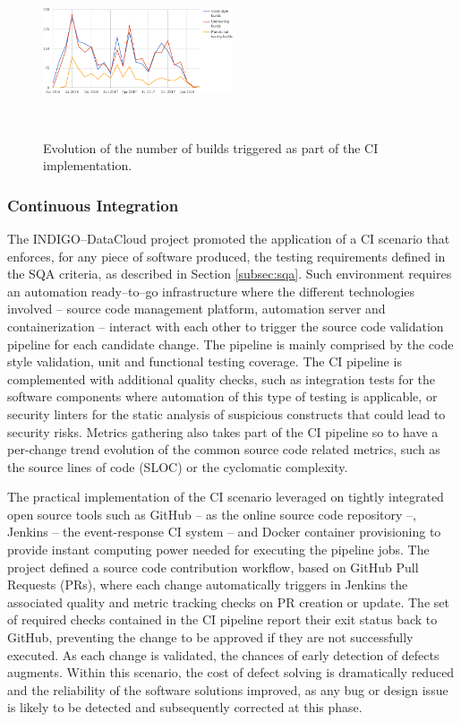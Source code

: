 \documentclass[journal]{IEEEtran}
\begin{document}
\begin{figure}[ht]
\centering
\includegraphics[width=0.5\textwidth, height=50mm]{images/jenkins_CI_builds.png}
\caption{Evolution of the number of builds triggered as part of the CI implementation.}
\label{fig:fig_jenkins_CI_builds}
\end{figure}

\subsubsection{Continuous Integration}
\label{subsec:ci}
The INDIGO--DataCloud project promoted the application of a CI scenario that enforces,
for any piece of software produced, the testing requirements defined in the SQA criteria,
as described in Section \ref{subsec:sqa}. Such environment requires an automation
ready--to--go infrastructure where the different technologies involved -- source code
management platform, automation server and containerization -- interact with each
other to trigger the source code validation pipeline for each candidate change. The
pipeline is mainly comprised by the code style validation, unit and functional testing
coverage. The CI pipeline is complemented with additional quality checks, such as 
integration tests for the software components where automation of this type of testing
is applicable, or security linters for the static analysis of suspicious
constructs that could lead to security risks. Metrics gathering also takes part of
the CI pipeline so to have a per-change trend evolution of the common source code 
related metrics, such as the source lines of code (SLOC) or the cyclomatic complexity. 

The practical implementation of the CI scenario leveraged on tightly integrated open
source tools such as GitHub \cite{github} -- as the online source code repository --,
Jenkins \cite{jenkins} -- the event-response CI system -- and Docker container
provisioning to provide instant computing power needed for executing the pipeline jobs. 
The project defined a source code contribution workflow, based on GitHub Pull Requests 
(PRs), where each change automatically triggers in Jenkins the associated quality and
metric tracking checks on PR creation or update. The set of required checks contained
in the CI pipeline report their exit status back to GitHub, preventing the change to be
approved if they are not successfully executed. As each change is validated, the chances
of early detection of defects augments. Within this scenario, the cost of defect solving
is dramatically reduced and the reliability of the software solutions improved, as any
bug or design issue is likely to be detected and subsequently corrected at this phase.
\end{document}
